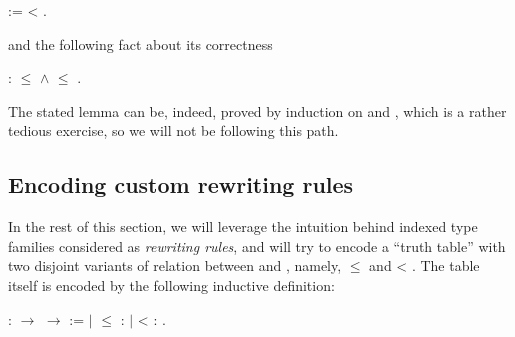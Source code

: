 \begin{coqdoccode}
\coqdocemptyline
\coqdocnoindent
{}    :=   <     .\coqdoceol
\coqdocemptyline
\end{coqdoccode}


and the following fact about its correctness


\coqdoceol
\coqdocemptyline
\coqdocnoindent
{}   :  \ensuremath{\le}    \ensuremath{\land}  \ensuremath{\le}   .

\coqdocemptyline


The stated lemma  can be, indeed, proved by induction on
 and , which is a rather tedious exercise, so we will not be
following this path.


\subsection{Encoding custom rewriting rules}


\label{sec:enccustom}


In the rest of this section, we will leverage the intuition behind
indexed type families considered as \textit{rewriting rules},
 and will try to encode a ``truth table''
 with two disjoint variants of relation between
 and , namely,  \ensuremath{\le}  and  < . The table itself is encoded
by the following inductive definition:




\begin{coqdoccode}
\coqdocemptyline
\coqdocnoindent
{}    :  \ensuremath{\rightarrow}  \ensuremath{\rightarrow}  :=\coqdoceol
\coqdocindent{1.00em}
\ensuremath{|}    \ensuremath{\le}  :     \coqdoceol
\coqdocindent{1.00em}
\ensuremath{|}    <   :     .\coqdoceol
\coqdocemptyline
\end{coqdoccode}


